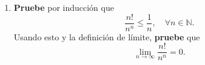 \documentclass[12pt]{article}
\begin{document}
\begin{enumerate}
\begin{proof}
            \begin{equation*}
                \begin{split}
                    \abs{\sqrt[8]{n^2+1}-\sqrt[4]{n+1}-0}\leq&\frac{1}{n}\\
                    <&\varepsilon\\
                    \Rightarrow \abs{\sqrt[8]{n^2+1}-\sqrt[4]{n+1}-0}<&\varepsilon\\
                \end{split}
            \end{equation*}
            Luego, de la definición de límite se sigue que
            \begin{equation*}
                \lim_{n\rightarrow\infty}\left(\sqrt[8]{n^2+1}-\sqrt[4]{n+1}\right)=0
            \end{equation*}
            \qed
        \end{proof}
    \item \textbf{Pruebe} por inducción que
        \begin{equation*}
            \frac{n!}{n^n}\leq\frac{1}{n},\quad\forall n\in\mathbb{N}.
        \end{equation*}
        Usando esto y la definición de límite, \textbf{pruebe} que
        \begin{equation*}
            \lim_{n\rightarrow\infty}\frac{n!}{n^n}=0.
        \end{equation*}
        

\end{enumerate}
\end{document}
